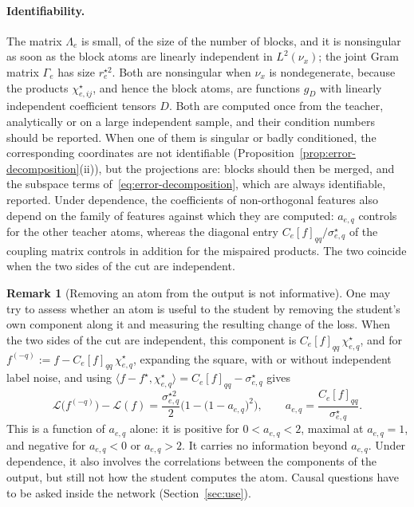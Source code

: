 \documentclass[11pt]{article}
\theoremstyle{definition}
\newtheorem{remark}[theorem]{Remark}
\numberwithin{equation}{section}
\begin{document}
\paragraph{Identifiability.}
The matrix $\Lambda_e$ is small, of the size of the number of blocks, and it is nonsingular as soon as the block atoms are linearly independent in $L^2(\nu_x)$; the joint Gram matrix $\Gamma_e$ has size $r^{\star2}_e$. Both are nonsingular when $\nu_x$ is nondegenerate, because the products $\chi^\star_{e,ij}$, and hence the block atoms, are functions $g_D$ with linearly independent coefficient tensors $D$. Both are computed once from the teacher, analytically or on a large independent sample, and their condition numbers should be reported. When one of them is singular or badly conditioned, the corresponding coordinates are not identifiable (Proposition~\ref{prop:error-decomposition}(ii)), but the projections are: blocks should then be merged, and the subspace terms of~\eqref{eq:error-decomposition}, which are always identifiable, reported. Under dependence, the coefficients of non-orthogonal features also depend on the family of features against which they are computed: $a_{e,q}$ controls for the other teacher atoms, whereas the diagonal entry $C_e[f]_{qq}/\sigma^\star_{e,q}$ of the coupling matrix controls in addition for the mispaired products. The two coincide when the two sides of the cut are independent.

\begin{remark}[Removing an atom from the output is not informative]\label{rem:output-ablation}
One may try to assess whether an atom is useful to the student by removing the student's own component along it and measuring the resulting change of the loss. When the two sides of the cut are independent, this component is $C_e[f]_{qq}\,\chi^\star_{e,q}$, and for $f^{(-q)}:=f-C_e[f]_{qq}\,\chi^\star_{e,q}$, expanding the square, with or without independent label noise, and using $\langle f-f^\star,\chi^\star_{e,q}\rangle=C_e[f]_{qq}-\sigma^\star_{e,q}$ gives
\[
\mathcal L\big(f^{(-q)}\big)-\mathcal L(f)=\frac{\sigma^{\star2}_{e,q}}2\Big(1-\big(1-a_{e,q}\big)^2\Big),\qquad a_{e,q}=\frac{C_e[f]_{qq}}{\sigma^\star_{e,q}}.
\]
This is a function of $a_{e,q}$ alone: it is positive for $0<a_{e,q}<2$, maximal at $a_{e,q}=1$, and negative for $a_{e,q}<0$ or $a_{e,q}>2$. It carries no information beyond $a_{e,q}$. Under dependence, it also involves the correlations between the components of the output, but still not how the student computes the atom. Causal questions have to be asked inside the network (Section~\ref{sec:use}).
\end{remark}
\end{document}
